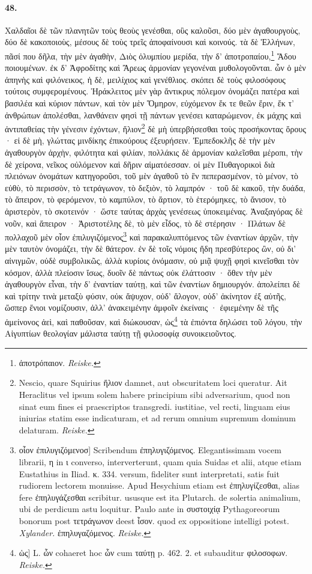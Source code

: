 \documentclass[a4paper, 11pt, oneside, polutonikogreek, german]{article}
\begin{document}
\paragraph{48.}
Χαλδαῖοι δὲ τῶν πλανητῶν τοὺς θεοὺς γενέσθαι, οὓς καλοῦσι, δύο μὲν ἀγαθουργοὺς, δύο δὲ κακοποιοὺς, μέσους δὲ τοὺς τρεῖς ἀποφαίνουσι καὶ κοινούς. τὰ δὲ Ἑλλήνων, πᾶσί που δῆλα, τὴν μὲν ἀγαθὴν, Διὸς ὀλυμπίου μερίδα, τὴν δ' ἀποτροπαίου,\footnote{ἀποτρόπαιον. \emph{Reiske.}} Ἅδου ποιουμένων. ἐκ δ' Ἀφροδίτης καὶ Ἄρεως ἁρμονίαν γεγονέναι μυθολογοῦνται. ὧν ὁ μὲν ἀπηνὴς καὶ φιλόνεικος, ἡ δὲ, μειλίχιος καὶ γενέθλιος. σκόπει δὲ τοὺς φιλοσόφους τούτοις συμφερομένους. Ἡράκλειτος μὲν γὰρ ἄντικρυς πόλεμον ὀνομάζει πατέρα καὶ βασιλέα καὶ κύριον πάντων, καὶ τὸν μὲν Ὅμηρον, εὐχόμενον ἔκ τε θεῶν ἔριν, ἔκ τ' ἀνθρώπων ἀπολέσθαι, λανθάνειν φησὶ τῇ πάντων γενέσει καταρώμενον, ἐκ μάχης καὶ ἀντιπαθείας τὴν γένεσιν ἐχόντων, ἥλιον\footnote{Nescio, quare Squirius ἥλιον damnet, aut obscuritatem loci queratur. Ait Heraclitus vel ipsum solem habere principium sibi adversarium, quod non sinat eum fines ei praescriptos transgredi. iustitiae, vel recti, linguam eius iniurias statim esse indicaturam, et ad rerum omnium supremum dominum delaturam. \emph{Reiske.}} δὲ μὴ ὑπερβήσεσθαι τοὺς προσήκοντας ὅρους · εἰ δὲ μὴ, γλώττας μινδίκης ἐπικούρους ἐξευρήσειν. Ἐμπεδοκλῆς δὲ τὴν μὲν ἀγαθουργὸν ἀρχὴν, φιλότητα καὶ φιλίαν, πολλάκις δὲ ἁρμονίαν καλεῖσθαι μέροπι, τὴν δὲ χείρονα, νεῖκος οὐλόμενον καὶ δῆριν αἱματόεσσαν. οἱ μὲν Πυθαγορικοὶ διὰ πλειόνων ὀνομάτων κατηγοροῦσι, τοῦ μὲν ἀγαθοῦ τὸ ἓν πεπερασμένον, τὸ μένον, τὸ εὐθὺ, τὸ περισσὸν, τὸ τετράγωνον, τὸ δεξιὸν, τὸ λαμπρόν · τοῦ δὲ κακοῦ, τὴν δυάδα, τὸ ἄπειρον, τὸ φερόμενον, τὸ καμπύλον, τὸ ἄρτιον, τὸ ἑτερόμηκες, τὸ ἄνισον, τὸ ἀριστερὸν, τὸ σκοτεινόν · ὥστε ταύτας ἀρχὰς γενέσεως ὑποκειμένας. Ἀναξαγόρας δὲ νοῦν, καὶ ἄπειρον · Ἀριστοτέλης δὲ, τὸ μὲν εἶδος, τὸ δὲ στέρησιν · Πλάτων δὲ πολλαχοῦ μὲν οἷον ἐπιλυγιζόμενος\footnote{οἷον ἐπιλυγιζόμενοσ] Scribendum ἐπηλυγιζόμενος. Elegantissimam vocem librarii, η in ι converso, interverterunt, quam quia Suidas et alii, atque etiam Eustathius in Iliad. κ. 334. versum, fideliter sunt interpretati, satis fuit rudiorem lectorem monuisse. Apud Hesychium etiam est ἐπηλυγίζεσθαι, alias fere ἐπηλυγάζεσθαι scribitur. ususque est ita Plutarch. de solertia animalium, ubi de perdicum astu loquitur. Paulo ante in συστοιχίᾳ Pythagoreorum bonorum post τετράγωνον deest ἶσον. quod ex oppositione intelligi potest. \emph{Xylander.} ἐπηλυγαζόμενος. \emph{Reiske.}} καὶ παρακαλυπτόμενος τῶν ἐναντίων ἀρχῶν, τὴν μὲν ταυτὸν ὀνομάζει, τὴν δὲ θάτερον. ἐν δὲ τοῖς νόμοις ἤδη πρεσβύτερος ὢν, οὐ δι' αἰνιγμῶν, οὐδὲ συμβολικῶς, ἀλλὰ κυρίοις ὀνόμασιν, οὐ μιᾷ ψυχῇ φησὶ κινεῖσθαι τὸν κόσμον, ἀλλὰ πλείοσιν ἴσως, δυοῖν δὲ πάντως οὐκ ἐλάττοσιν · ὅθεν τὴν μὲν ἀγαθουργὸν εἶναι, τὴν δ' ἐναντίαν ταύτῃ, καὶ τῶν ἐναντίων δημιουργόν. ἀπολείπει δὲ καὶ τρίτην τινὰ μεταξὺ φύσιν, οὐκ ἄψυχον, οὐδ' ἄλογον, οὐδ' ἀκίνητον ἐξ αὑτῆς, ὥσπερ ἔνιοι νομίζουσιν, ἀλλ' ἀνακειμένην ἀμφοῖν ἐκείναις · ἐφιεμένην δὲ τῆς ἀμείνονος ἀεὶ, καὶ παθοῦσαν, καὶ διώκουσαν, ὡς\footnote{ὡς] L. ὧν cohaeret hoc ὧν cum ταύτῃ p. 462. 2. et subauditur φιλοσοφων. \emph{Reiske.}} τὰ ἐπιόντα δηλώσει τοῦ λόγου, τὴν Αἰγυπτίων θεολογίαν μάλιστα ταύτῃ τῇ φιλοσοφίᾳ συνοικειοῦντος.
\end{document}
